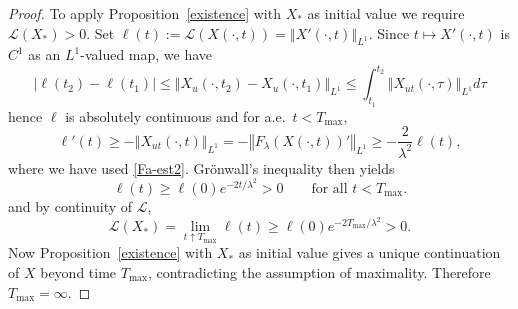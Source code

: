 \documentclass[10pt,a4paper]{amsart}
\def\R{\mathbb{R}}
\def\S{\mathbb{S}}
\def\length{\mathcal L}
\newcommand{\norm}[1]{{\left \Vert {#1}\right \Vert}}
\begin{document}
\begin{proof}
To apply Proposition~\ref{existence} with $X_*$ as initial value we require $\length(X_*)>0$.
Set $\ell(t):=\length(X(\cdot,t))=\norm{X'(\cdot,t)}_{L^1}$. 
Since $t\mapsto X'(\cdot,t)$ is $C^1$ as an $L^1$-valued map, we have
\[
|\ell(t_2)-\ell(t_1)|\leq \norm{X_u(\cdot,t_2)-X_u(\cdot,t_1)}_{L^1}\leq \int_{t_1}^{t_2}\norm{X_{ut}(\cdot, \tau)}_{L^1}d\tau
\]
hence $\ell$ is absolutely continuous and for a.e.\ $t<T_{\max}$,
\[
\ell'(t)\ge -\norm{X_{ut}(\cdot,t)}_{L^1}
=-\norm{F_\lambda(X(\cdot,t))'}_{L^1}
\ge -\frac{2}{\lambda^2}\ell(t),
\]
where we have used \eqref{Fa-est2}. Gr\"onwall's inequality then yields
\begin{equation}\label{lengthlowerbound}
\ell(t)\ge \ell(0)e^{-2t/\lambda^2}>0
\qquad\text{for all }t<T_{\max}.
\end{equation}
and by continuity of $\length$,
\[
\length(X_*)=\lim_{t\uparrow T_{\max}}\ell(t)\ge \ell(0)e^{-2T_{\max}/\lambda^2}>0.
\]
Now Proposition~\ref{existence} with $X_*$ as initial value gives a unique continuation of $X$ beyond time $T_{\max}$, contradicting the assumption of maximality. Therefore $T_{\max}=\infty$.
\end{proof}
\end{document}
